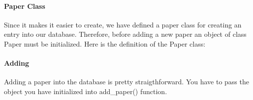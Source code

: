 \documentclass[letterpaper,10pt,english]{sphinxmanual}
\begin{document}
\paragraph{Paper Class}
\label{\detokenize{developer/kaplan:paper-class}}
Since it makes it easier to create, we have defined a paper class for creating an entry into our database.
Therefore, before adding a new paper an object of class Paper must be initialized. Here is the definition of
the Paper class:

\begin{sphinxVerbatim}[commandchars=\\\{\}]
 
          
          
          
          
          
          
\end{sphinxVerbatim}


\paragraph{Adding}
\label{\detokenize{developer/kaplan:id27}}
Adding a paper into the database is pretty straigthforward. You have to pass the object you have initialized
into add\_paper() function.
\end{document}
